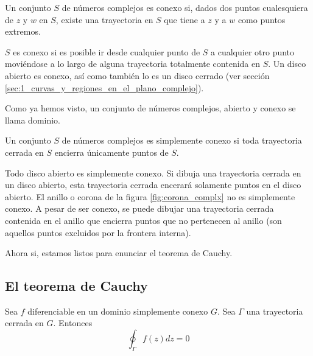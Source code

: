 \begin{definition}
  Un conjunto $S$ de números complejos es conexo si, dados dos puntos cualesquiera de $z$ y $w$ en $S$, existe una trayectoria en $S$ que tiene a $z$ y a $w$ como puntos extremos.
\end{definition}

$S$ es conexo si es posible ir desde cualquier punto de $S$ a cualquier otro punto moviéndose a lo largo de alguna trayectoria totalmente contenida en $S$. Un disco abierto es conexo, así como también lo es un disco cerrado (ver sección \ref{sec:1_curvas_y_regiones_en_el_plano_complejo}).

\begin{definition}[Dominio]
  Como ya hemos visto, un conjunto de números complejos, abierto y conexo se llama dominio.
\end{definition}

\begin{definition}
  Un conjunto $S$ de números complejos es simplemente conexo si toda trayectoria cerrada en $S$ encierra únicamente puntos de $S$.
\end{definition}

Todo disco abierto es simplemente conexo. Si dibuja una trayectoria cerrada en un disco abierto, esta trayectoria cerrada encerará solamente puntos en el disco abierto. El anillo o corona de la figura \ref{fig:corona_complx} no es simplemente conexo. A pesar de ser conexo, se puede dibujar una trayectoria cerrada contenida en el anillo que encierra puntos que no pertenecen al anillo (son aquellos puntos excluidos por la frontera interna).

Ahora si, estamos listos para enunciar el teorema de Cauchy.

\subsection[Enunciado del teorema]{El teorema de Cauchy}

\begin{theorem}
  Sea $f$ diferenciable en un dominio simplemente conexo $G$. Sea $\Gamma$ una trayectoria cerrada en $G$. Entonces
  \[
    \oint_\Gamma f(z)dz=0
  \]
\end{theorem}
